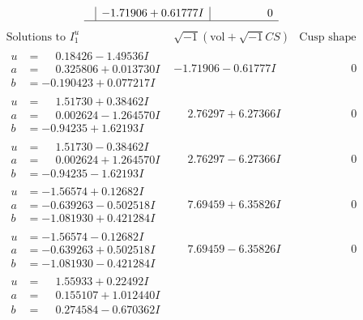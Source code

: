 \documentclass[1p]{elsarticle_modified}
\theoremstyle{definition}
\newcommand{\I}{\sqrt{-1}}
\begin{document}
$$\begin{array}{c|c|c}
 & -1.71906 + 0.61777 I & \phantom{-0.000000 } 0\\
 \hline 
 \end{array}$$\newpage$$\begin{array}{c|c|c}  
\text{Solutions to }I^u_{1}& \I (\text{vol} + \sqrt{-1}CS) & \text{Cusp shape}\\
 \hline 
\begin{aligned}
u &= \phantom{-}0.18426 - 1.49536 I \\
a &= \phantom{-}0.325806 + 0.013730 I \\
b &= -0.190423 + 0.077217 I\end{aligned}
 & -1.71906 - 0.61777 I & \phantom{-0.000000 } 0 \\ \hline\begin{aligned}
u &= \phantom{-}1.51730 + 0.38462 I \\
a &= \phantom{-}0.002624 - 1.264570 I \\
b &= -0.94235 + 1.62193 I\end{aligned}
 & \phantom{-}2.76297 + 6.27366 I & \phantom{-0.000000 } 0 \\ \hline\begin{aligned}
u &= \phantom{-}1.51730 - 0.38462 I \\
a &= \phantom{-}0.002624 + 1.264570 I \\
b &= -0.94235 - 1.62193 I\end{aligned}
 & \phantom{-}2.76297 - 6.27366 I & \phantom{-0.000000 } 0 \\ \hline\begin{aligned}
u &= -1.56574 + 0.12682 I \\
a &= -0.639263 - 0.502518 I \\
b &= -1.081930 + 0.421284 I\end{aligned}
 & \phantom{-}7.69459 + 6.35826 I & \phantom{-0.000000 } 0 \\ \hline\begin{aligned}
u &= -1.56574 - 0.12682 I \\
a &= -0.639263 + 0.502518 I \\
b &= -1.081930 - 0.421284 I\end{aligned}
 & \phantom{-}7.69459 - 6.35826 I & \phantom{-0.000000 } 0 \\ \hline\begin{aligned}
u &= \phantom{-}1.55933 + 0.22492 I \\
a &= \phantom{-}0.155107 + 1.012440 I \\
b &= \phantom{-}0.274584 - 0.670362 I\end{aligned}

\end{array}$$
\end{document}
